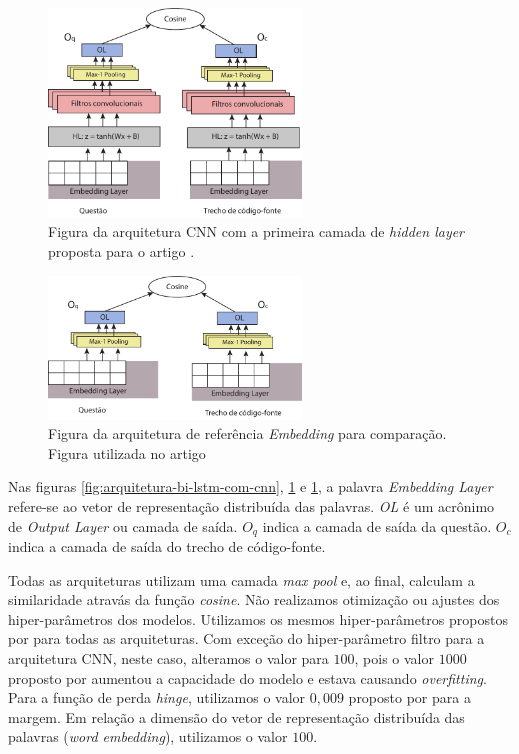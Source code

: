 \begin{figure}[h]
    \centering
    \includegraphics[width=0.6\textwidth]{figuras/cap-resultados-preliminares/ArquiteturaCNN.pdf}
    \caption{Figura da arquitetura CNN com a primeira camada de \textit{hidden layer} proposta para o artigo \cite{marcelo-vem-2019}.}
    \label{fig:arquitetura-cnn}
\end{figure}

\begin{figure}[h]
    \centering
    \includegraphics[width=0.6\textwidth]{figuras/cap-resultados-preliminares/ArquiteturaEmbedding.pdf}
    \caption{Figura da arquitetura de referência \textit{Embedding} para comparação. Figura utilizada no artigo \cite{marcelo-vem-2019}}
    \label{fig:arquitetura-embedding}
\end{figure}
Nas figuras \ref{fig:arquitetura-bi-lstm-com-cnn}, \ref{fig:arquitetura-cnn} e \ref{fig:arquitetura-cnn}, a palavra \textit{Embedding Layer} refere-se ao vetor de representação distribuída das palavras. \emph{OL} é um acrônimo de \textit{Output Layer} ou camada de saída. $O_{q}$ indica a camada de saída da questão. $O_{c}$ indica a camada de saída do trecho de código-fonte.

Todas as arquiteturas utilizam uma camada \textit{max pool} e, ao final, calculam a similaridade atravás da função \textit{cosine}.
Não realizamos otimização ou ajustes dos hiper-parâmetros dos modelos. Utilizamos os mesmos hiper-parâmetros propostos por \cite{tan-lstm-qa} para todas as arquiteturas. Com exceção do hiper-parâmetro filtro para a arquitetura CNN, neste caso, alteramos o valor para $100$, pois o valor $1000$ proposto por \cite{tan-lstm-qa} aumentou a capacidade do modelo e estava causando \textit{overfitting}. Para a função de perda \textit{hinge}, utilizamos o valor $0,009$ proposto por \cite{feng-2015} para a margem. Em relação a dimensão do vetor de representação distribuída das palavras (\textit{word embedding}), utilizamos o valor $100$.


